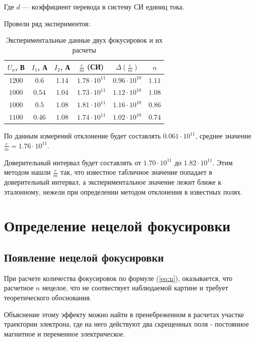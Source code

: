 Где $d$ --- коэффициент перевода в систему СИ единиц тока.

Провели ряд экспериментов: 

\begin{table}[ht!]
\begin{center}
\begin{tabular}{|c|c|c|c|c|c|}

\hline
$U_a$, В & $I_1$, А & $I_2$, А & $\frac{e}{m}$ (СИ) & $\Delta{(\frac{e}{m})}$ & $n$\\
\hline
$1200$ & $0.6$ & $1.14$ & $1.78\cdot10^{11}$ & $0.96\cdot10^{10}$  & $1.11$ \\ \hline
$1000$ & $0.54$ & $1.04$ & $1.73\cdot10^{11}$ & $1.12\cdot10^{10}$ & $1.08$ \\ \hline
$1000$ & $0.5$ & $1.08$ & $1.81\cdot10^{11}$ & $1.16\cdot10^{10}$  & $0.86$ \\ \hline
$1100$ & $0.46$ & $1.08$ & $1.74\cdot10^{11}$ & $1.02\cdot10^{10}$ & $0.74$ \\ \hline

\end{tabular}
\end{center}
\caption{\label{tab:B_z}Экспериментальные данные двух фокусировок и их расчеты}
\end{table} 


По данным измерений отклонение будет составлять $0.061\cdot10^{11}$, среднее значение $\frac{e}{m}=1.76\cdot10^{11}$.

Доверительный интервал будет составлять от $1.70\cdot10^{11}$ до $1.82\cdot10^{11}$. Этим методом нашли $\frac{e}{m}$ так, что известное табличное значение попадает в доверительный интервал, а экспериментальное значение лежит ближе к эталонному, нежели при определении методом отклонения в известных полях.

\newpage
\section{Определение нецелой фокусировки}

\subsection{Появление нецелой фокусировки}

При расчете количества фокусировок по формуле (\ref{eq:n}), оказывается, что расчетное $n$ нецелое, что не соотвествует наблюдаемой картине и требует теоретического обоснования.

Объяснение этому эффекту можно найти в пренебреженном в расчетах участке траектории электрона, где на него действуют два скрещенных поля - постоянное магнитное и переменное электрическое.

